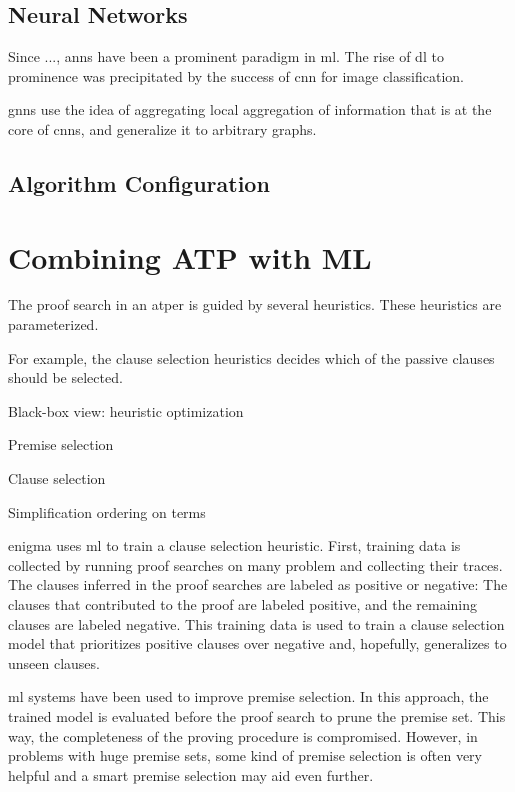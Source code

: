 \subsection{Neural Networks}

Since ..., \glspl{ann} have been a prominent paradigm in \gls{ml}.
The rise of \gls{dl} to prominence was precipitated by the success of \gls{cnn} for image classification.

\Glspl{gnn} use the idea of aggregating local aggregation of information that is at the core of \glspl{cnn}, and generalize it to arbitrary graphs.

\subsection{Algorithm Configuration}

\section{Combining ATP with ML}

The proof search in an \gls{atper} is guided by several heuristics.
These heuristics are parameterized.

For example, the clause selection heuristics decides which of the passive clauses should be selected.

Black-box view: heuristic optimization

Premise selection

Clause selection

Simplification ordering on terms


\Gls{enigma} uses \gls{ml} to train a clause selection heuristic.
First, training data is collected by running proof searches on many problem and collecting their traces.
The clauses inferred in the proof searches are labeled as positive or negative:
The clauses that contributed to the proof are labeled positive, and the remaining clauses are labeled negative.
This training data is used to train a clause selection model that prioritizes positive clauses over negative and, hopefully, generalizes to unseen clauses.

\Gls{ml} systems have been used to improve premise selection.
In this approach, the trained model is evaluated before the proof search to prune the premise set.
This way, the completeness of the proving procedure is compromised.
However, in problems with huge premise sets, some kind of premise selection is often very helpful and a smart premise selection may aid even further.

